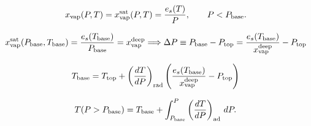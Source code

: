 \documentclass[11pt]{ucscthesisbs}
\begin{document}
\begin{equation}
	x_{\rm vap}(P, T) = x_{\rm vap}^{\rm sat}(P, T) = \frac{e_s(T)}{P}, \qquad P<P_{\rm base}.
\end{equation}

\begin{equation}
x_{\rm vap}^{\rm sat}(P_{\rm base}, T_{\rm base}) = \frac{e_s(T_{\rm base})}{P_{\rm base}}=x_{\rm vap}^{\rm deep}
\Longrightarrow \Delta P \equiv P_{\rm base}-P_{\rm top} = \frac{e_s(T_{\rm base})}{x_{\rm vap}^{\rm deep}} - P_{\rm top}
\end{equation}

\begin{equation}
	T_{\rm base} = T_{\rm top} + \left(\frac{dT}{dP}\right)_{\rm rad}\left(\frac{e_s(T_{\rm base})}{x_{\rm vap}^{\rm deep}} - P_{\rm top}\right)
\end{equation}

\begin{equation}
T(P>P_{\rm base}) = T_{\rm base} + \int_{P_{\rm base}}^P\left(\frac{dT}{dP}\right)_{\rm ad}\,d P. \label{eq.t_of_p_deep_dry}
\end{equation}
\end{document}
